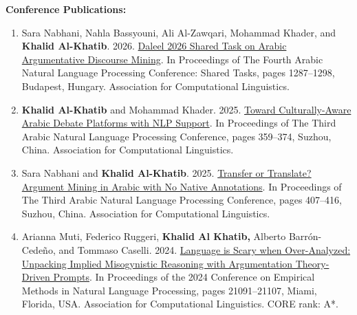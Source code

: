 


\textbf{Conference Publications:}

\begin{enumerate}

\item Sara Nabhani, Nahla Bassyouni, Ali Al-Zawqari, Mohammad Khader, and \textbf{Khalid Al-Khatib}. 2026. \href{https://aclanthology.org/2026.arabicnlp-sharedtasks.161/}{Daleel 2026 Shared Task on Arabic Argumentative Discourse Mining}. In Proceedings of The Fourth Arabic Natural Language Processing Conference: Shared Tasks, pages 1287--1298, Budapest, Hungary. Association for Computational Linguistics.

\item \textbf{Khalid Al-Khatib} and Mohammad Khader. 2025. \href{https://aclanthology.org/2025.arabicnlp-main.29/}{Toward Culturally-Aware Arabic Debate Platforms with NLP Support}. In Proceedings of The Third Arabic Natural Language Processing Conference, pages 359--374, Suzhou, China. Association for Computational Linguistics.
\item Sara Nabhani and \textbf{Khalid Al-Khatib}. 2025. \href{https://aclanthology.org/2025.arabicnlp-main.33/}{Transfer or Translate? Argument Mining in Arabic with No Native Annotations}. In Proceedings of The Third Arabic Natural Language Processing Conference, pages 407--416, Suzhou, China. Association for Computational Linguistics.
 \item Arianna Muti, Federico Ruggeri, \textbf{Khalid Al Khatib,} Alberto Barrón-Cedeño, and Tommaso Caselli. 2024. \href{https://aclanthology.org/2024.emnlp-main.1174/}{Language is Scary when Over-Analyzed: Unpacking Implied Misogynistic Reasoning with Argumentation Theory-Driven Prompts}. In Proceedings of the 2024 Conference on Empirical Methods in Natural Language Processing, pages 21091–21107, Miami, Florida, USA. Association for Computational Linguistics.
 CORE rank: A*.


\end{enumerate}
